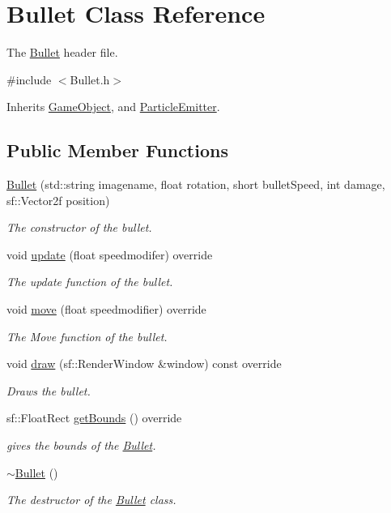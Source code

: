 \hypertarget{class_bullet}{\section{Bullet Class Reference}
\label{class_bullet}
}


The \hyperlink{class_bullet}{Bullet} header file.  




{\ttfamily \#include $<$Bullet.\+h$>$}



Inherits \hyperlink{class_game_object}{Game\+Object}, and \hyperlink{class_particle_emitter}{Particle\+Emitter}.

\subsection*{Public Member Functions}
\begin{DoxyCompactItemize}
\item 
\hyperlink{class_bullet_a181d413f4a8195bc42fce2b5a77f9bd0}{Bullet} (std\+::string imagename, float rotation, short bullet\+Speed, int damage, sf\+::\+Vector2f position)
\begin{DoxyCompactList}\small\item\em The constructor of the bullet. \end{DoxyCompactList}\item 
void \hyperlink{class_bullet_acfcfcf7146d04ad78520292c55ca6eee}{update} (float speedmodifer) override
\begin{DoxyCompactList}\small\item\em The update function of the bullet. \end{DoxyCompactList}\item 
void \hyperlink{class_bullet_ac1d4f701d0eb4a2ff0eb30c68ce545da}{move} (float speedmodifier) override
\begin{DoxyCompactList}\small\item\em The Move function of the bullet. \end{DoxyCompactList}\item 
void \hyperlink{class_bullet_a196f55015a331416e3f406d8d2065f36}{draw} (sf\+::\+Render\+Window \&window) const override
\begin{DoxyCompactList}\small\item\em Draws the bullet. \end{DoxyCompactList}\item 
sf\+::\+Float\+Rect \hyperlink{class_bullet_ac713e5b80340e69140494df3451c4be6}{get\+Bounds} () override
\begin{DoxyCompactList}\small\item\em gives the bounds of the \hyperlink{class_bullet}{Bullet}. \end{DoxyCompactList}\item 
\hyperlink{class_bullet_aaeb5cb41d7db89f49007b08b41f1bfcf}{$\sim$\+Bullet} ()
\begin{DoxyCompactList}\small\item\em The destructor of the \hyperlink{class_bullet}{Bullet} class. \end{DoxyCompactList}\end{DoxyCompactItemize}

